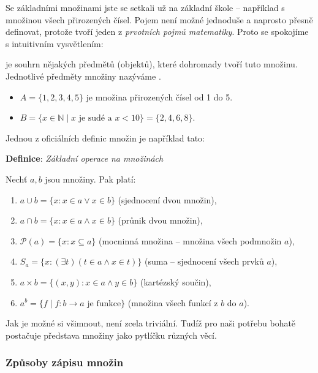 \documentclass[12pt,a4paper]{article}
\begin{document}
Se základními množinami jste se setkali už na základní škole – například s množinou všech přirozených čísel.  
Pojem  není možné jednoduše a 
naprosto přesně definovat, protože tvoří jeden z 
\emph{prvotních pojmů matematiky}. Proto se spokojíme s intuitivním vysvětlením:  

\begin{definitionbox}
 je souhrn nějakých předmětů (objektů), které dohromady tvoří tuto množinu.  
Jednotlivé předměty množiny nazýváme .
\end{definitionbox}

\begin{examplebox}
\begin{itemize}
    \item $A = \{1,2,3,4,5\}$ je množina přirozených čísel od 1 do 5.  
    \item $B = \{x \in \mathbb{N} \mid x \text{ je sudé a } x < 10\} = \{2,4,6,8\}$.
\end{itemize}
\end{examplebox}


Jednou z oficiálních definic množin je například tato:
\begin{definitionbox}
\textbf{Definice}: \emph{Základní operace na množinách}

Nechť $a, b$ jsou množiny. Pak platí:
\begin{enumerate}
    \item $a \cup b = \{x : x \in a \lor x \in b\}$ \quad (sjednocení dvou množin),
    \item $a \cap b = \{x : x \in a \land x \in b\}$ \quad (průnik dvou množin),
    \item $\mathcal{P}(a) = \{x : x \subseteq a\}$ \quad (mocninná množina – množina všech podmnožin $a$),
    \item $S_a = \{x : (\exists t)(t \in a \land x \in t)\}$ \quad (suma – sjednocení všech prvků $a$),
    \item $a \times b = \{(x,y) : x \in a \land y \in b\}$ \quad (kartézský součin),
    \item $a^b = \{ f \mid f : b \to a \text{ je funkce} \}$ \quad (množina všech funkcí z $b$ do $a$).
\end{enumerate}
\end{definitionbox}
Jak je možné si všimnout, není zcela triviální. Tudíž pro naši potřebu bohatě postačuje 
představa množiny jako pytlíčku různých věcí.

\subsubsection*{Způsoby zápisu množin}
\end{document}
